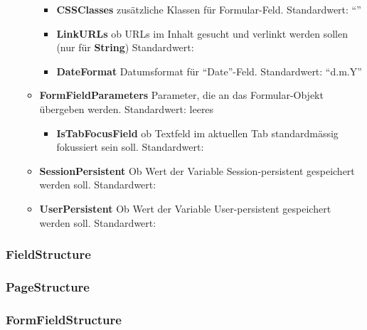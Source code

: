 \begin{itemize}
\begin{itemize}
\begin{itemize}
                                \item \textbf{CSSClasses}\superscript{*}  zusätzliche Klassen für Formular-Feld. Standardwert: ``''
                                \item \textbf{LinkURLs}\superscript{*}  ob URLs im Inhalt gesucht und verlinkt werden sollen (nur für \textbf{String}) Standardwert: 
                                \item \textbf{DateFormat}\superscript{*}  Datumsformat für ``Date''-Feld. Standardwert: ``d.m.Y''
                            \end{itemize}
                        \item \textbf{FormFieldParameters}\superscript{*}  Parameter, die an das Formular-Objekt übergeben werden. Standardwert: leeres 
                            \begin{itemize}
                                \item \textbf{IsTabFocusField}\superscript{*}  ob Textfeld im aktuellen Tab standardmässig fokussiert sein soll. Standardwert: 
                            \end{itemize}
                        \item \textbf{SessionPersistent}\superscript{*}  Ob Wert der Variable Session-persistent gespeichert werden soll. Standardwert: 
                        \item \textbf{UserPersistent}\superscript{*}  Ob Wert der Variable User-persistent gespeichert werden soll. Standardwert: 

                    \end{itemize}


            \end{itemize}

        \subsubsection{FieldStructure}

        \subsubsection{PageStructure}

        \subsubsection{FormFieldStructure}

